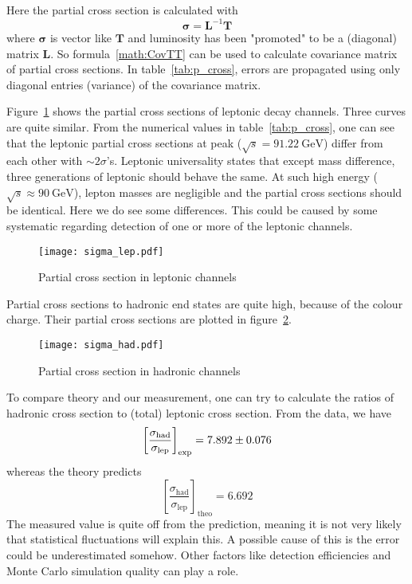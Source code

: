 Here the partial cross section is calculated with
\begin{equation}
	\pmb\sigma = \mathbf{L}^{-1} \mathbf{T}
\end{equation}
where $\pmb\sigma$ is vector like $\mathbf T$ and luminosity has been "promoted" to be a (diagonal) matrix $\mathbf L$. So formula~\ref{math:CovTT} can be used to calculate covariance matrix of partial cross sections. In table~\ref{tab:p_cross}, errors are propagated using only diagonal entries (variance) of the covariance matrix.

Figure~\ref{fig:lepCross} shows the partial cross sections of leptonic decay channels. Three curves are quite similar. From the numerical values in table~\ref{tab:p_cross}, one can see that the leptonic partial cross sections at peak ($\sqrt{s} = \SI{91.22}{\giga\eV}$) differ from each other with $\sim 2 \sigma$'s. Leptonic universality states that except mass difference, three generations of leptonic should behave the same. At such high energy ($\sqrt{s} \approx \SI{90}{\giga\eV}$), lepton masses are negligible and the partial cross sections should be identical. Here we do see some differences. This could be caused by some systematic regarding detection of one or more of the leptonic channels.
\begin{figure}[ht]
	\centering
	\texttt{[image: sigma\_lep.pdf]}
	\caption{Partial cross section in leptonic channels}%
	\label{fig:lepCross}
\end{figure}

Partial cross sections to hadronic end states are quite high, because of the colour charge. Their partial cross sections are plotted in figure~\ref{fig:hadCross}.
\begin{figure}[ht]
	\centering
	\texttt{[image: sigma\_had.pdf]}
	\caption{Partial cross section in hadronic channels}%
	\label{fig:hadCross}
\end{figure}

To compare theory and our measurement, one can try to calculate the ratios of hadronic cross section to (total) leptonic cross section. From the data, we have
\begin{equation}
	\left[ \frac{\sigma_\text{had}}{\sigma_\text{lep}} \right]_\text{exp}= \num{7.892 +- 0.076}
\end{equation}
whereas the theory predicts
\begin{equation}
	\left[ \frac{\sigma_\text{had}}{\sigma_\text{lep}} \right]_\text{theo}= \num{6.692}
\end{equation}
The measured value is quite off from the prediction, meaning it is not very likely that statistical fluctuations will explain this. A possible cause of this is the error could be underestimated somehow. Other factors like detection efficiencies and Monte Carlo simulation quality can play a role.

